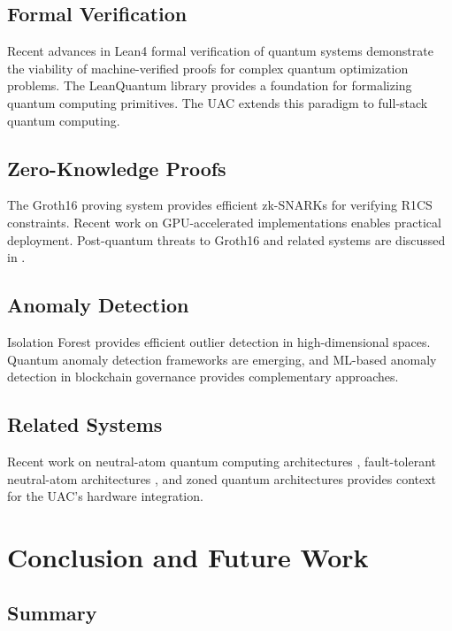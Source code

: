 \documentclass[11pt,a4paper]{article}
\theoremstyle{plain}
\begin{document}
\subsection{Formal Verification}

Recent advances in Lean4 formal verification of quantum systems \cite{leanQuantum, leanOptimization} demonstrate the viability of machine-verified proofs for complex quantum optimization problems. The LeanQuantum library \cite{leanQuantum} provides a foundation for formalizing quantum computing primitives. The UAC extends this paradigm to full-stack quantum computing.

\subsection{Zero-Knowledge Proofs}

The Groth16 proving system \cite{groth16} provides efficient zk-SNARKs for verifying R1CS constraints. Recent work on GPU-accelerated implementations \cite{groth16GPU} enables practical deployment. Post-quantum threats to Groth16 and related systems are discussed in \cite{groth16PostQuantum}.

\subsection{Anomaly Detection}

Isolation Forest \cite{isolationForest} provides efficient outlier detection in high-dimensional spaces. Quantum anomaly detection frameworks \cite{qadFramework} are emerging, and ML-based anomaly detection in blockchain governance \cite{mlBlockchainGovernance} provides complementary approaches.

\subsection{Related Systems}

Recent work on neutral-atom quantum computing architectures \cite{neutralAtom}, fault-tolerant neutral-atom architectures \cite{neutralAtomFT}, and zoned quantum architectures \cite{zacCompiler} provides context for the UAC's hardware integration.

\section{Conclusion and Future Work}

\subsection{Summary}
\end{document}
